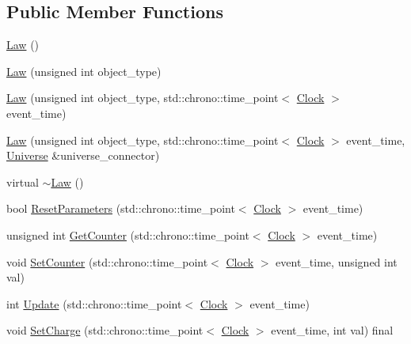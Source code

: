\subsection*{Public Member Functions}
\begin{DoxyCompactItemize}
\item 
\mbox{\hyperlink{classLaw_a3b94b6e9f09b8f457dba70f3b1c1ab43}{Law}} ()
\item 
\mbox{\hyperlink{classLaw_afd1730474b2806ec6665e16419f4994c}{Law}} (unsigned int object\+\_\+type)
\item 
\mbox{\hyperlink{classLaw_afdc75daa3a3346c473454c7a4dc2eab5}{Law}} (unsigned int object\+\_\+type, std\+::chrono\+::time\+\_\+point$<$ \mbox{\hyperlink{universe_8h_a0ef8d951d1ca5ab3cfaf7ab4c7a6fd80}{Clock}} $>$ event\+\_\+time)
\item 
\mbox{\hyperlink{classLaw_aa4fb7baf54aa77720605fd601fb80b8d}{Law}} (unsigned int object\+\_\+type, std\+::chrono\+::time\+\_\+point$<$ \mbox{\hyperlink{universe_8h_a0ef8d951d1ca5ab3cfaf7ab4c7a6fd80}{Clock}} $>$ event\+\_\+time, \mbox{\hyperlink{classUniverse}{Universe}} \&universe\+\_\+connector)
\item 
virtual \mbox{\hyperlink{classLaw_a4fa6f0fb61285152c8c6d7a17b51a82b}{$\sim$\+Law}} ()
\item 
bool \mbox{\hyperlink{classLaw_a56541ec0b82b8a7c377ae2e6b444205c}{Reset\+Parameters}} (std\+::chrono\+::time\+\_\+point$<$ \mbox{\hyperlink{universe_8h_a0ef8d951d1ca5ab3cfaf7ab4c7a6fd80}{Clock}} $>$ event\+\_\+time)
\item 
unsigned int \mbox{\hyperlink{classLaw_ab30a86ef88a85e13d3e598caa45bff05}{Get\+Counter}} (std\+::chrono\+::time\+\_\+point$<$ \mbox{\hyperlink{universe_8h_a0ef8d951d1ca5ab3cfaf7ab4c7a6fd80}{Clock}} $>$ event\+\_\+time)
\item 
void \mbox{\hyperlink{classLaw_a408c401c8a44870c29ba9d08b45cb40f}{Set\+Counter}} (std\+::chrono\+::time\+\_\+point$<$ \mbox{\hyperlink{universe_8h_a0ef8d951d1ca5ab3cfaf7ab4c7a6fd80}{Clock}} $>$ event\+\_\+time, unsigned int val)
\item 
int \mbox{\hyperlink{classLaw_a0240b10c679b671039dbf10771342ea7}{Update}} (std\+::chrono\+::time\+\_\+point$<$ \mbox{\hyperlink{universe_8h_a0ef8d951d1ca5ab3cfaf7ab4c7a6fd80}{Clock}} $>$ event\+\_\+time)
\item 
void \mbox{\hyperlink{classLaw_a2e780573f6285f88d167d45a2e243d01}{Set\+Charge}} (std\+::chrono\+::time\+\_\+point$<$ \mbox{\hyperlink{universe_8h_a0ef8d951d1ca5ab3cfaf7ab4c7a6fd80}{Clock}} $>$ event\+\_\+time, int val) final

\end{DoxyCompactItemize}
